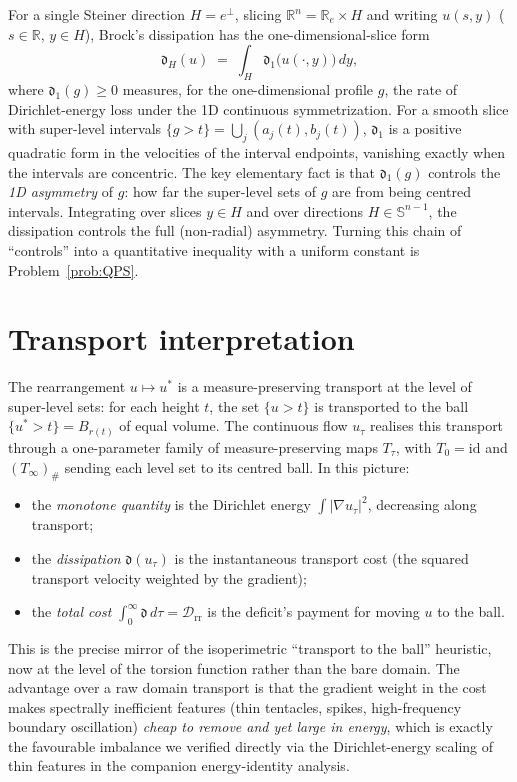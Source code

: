 \documentclass[11pt]{article}
\theoremstyle{definition}
\newcommand{\R}{\mathbb R}
\newcommand{\Drr}{\mathcal D_{\mathrm{rr}}}
\newcommand{\Sph}{\mathbb S^{n-1}}
\begin{document}
For a single Steiner direction $H=e^\perp$, slicing $\R^n=\R_e\times H$ and
writing $u(s,y)$ ($s\in\R$, $y\in H$), Brock's dissipation has the
one-dimensional-slice form
\begin{equation}\label{eq:diss-slice}
   \mathfrak d_H(u)\;=\;\int_H \mathfrak d_{1}\bigl(u(\cdot,y)\bigr)\,dy,
\end{equation}
where $\mathfrak d_1(g)\ge0$ measures, for the one-dimensional profile $g$,
the rate of Dirichlet-energy loss under the 1D continuous symmetrization. For
a smooth slice with super-level intervals $\{g>t\}=\bigcup_j(a_j(t),b_j(t))$,
$\mathfrak d_1$ is a positive quadratic form in the velocities of the
interval endpoints, vanishing exactly when the intervals are concentric. The
key elementary fact is that $\mathfrak d_1(g)$ controls the
\emph{1D asymmetry} of $g$: how far the super-level sets of $g$ are from being
centred intervals. Integrating over slices $y\in H$ and over directions
$H\in\Sph$, the dissipation controls the full (non-radial) asymmetry. Turning
this chain of ``controls'' into a quantitative inequality with a uniform
constant is Problem~\ref{prob:QPS}.

\section{Transport interpretation}
\label{sec:transport}

The rearrangement $u\mapsto u^*$ is a measure-preserving transport at the
level of super-level sets: for each height $t$, the set $\{u>t\}$ is
transported to the ball $\{u^*>t\}=B_{r(t)}$ of equal volume. The continuous
flow $u_\tau$ realises this transport through a one-parameter family of
measure-preserving maps $T_\tau$, with $T_0=\mathrm{id}$ and $(T_\infty)_\#$
sending each level set to its centred ball. In this picture:
\begin{itemize}[leftmargin=2em]
\item the \emph{monotone quantity} is the Dirichlet energy $\int|\nabla
u_\tau|^2$, decreasing along transport;
\item the \emph{dissipation} $\mathfrak d(u_\tau)$ is the instantaneous
transport cost (the squared transport velocity weighted by the gradient);
\item the \emph{total cost} $\int_0^\infty\mathfrak d\,d\tau=\Drr$ is the
deficit's payment for moving $u$ to the ball.
\end{itemize}
This is the precise mirror of the isoperimetric ``transport to the ball''
heuristic, now at the level of the torsion function rather than the bare
domain. The advantage over a raw domain transport is that the gradient weight
in the cost makes spectrally inefficient features (thin tentacles, spikes,
high-frequency boundary oscillation) \emph{cheap to remove and yet large in
energy}, which is exactly the favourable imbalance we verified directly via
the Dirichlet-energy scaling of thin features in the companion
energy-identity analysis.
\end{document}
